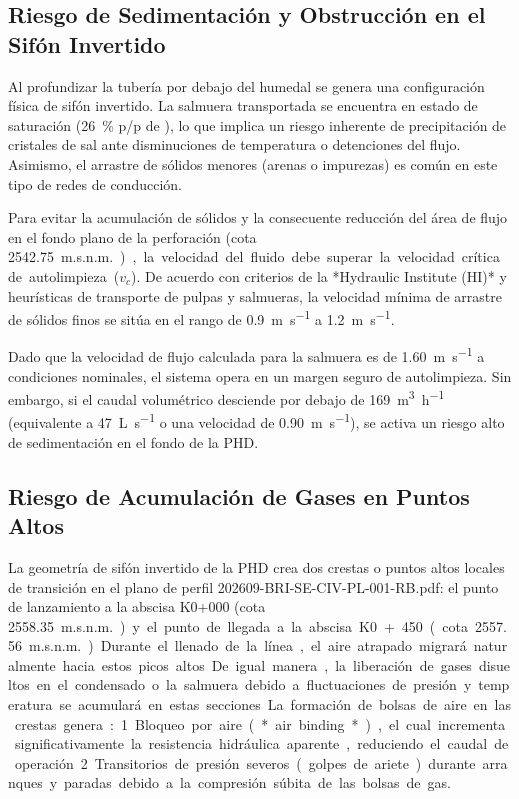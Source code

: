 \subsection{Riesgo de Sedimentación y Obstrucción en el Sifón Invertido}
\label{ssec:analisis_sedimentacion}

Al profundizar la tubería por debajo del humedal se genera una configuración física de sifón invertido. La salmuera transportada se encuentra en estado de saturación (\SI{26}{\percent} p/p de ), lo que implica un riesgo inherente de precipitación de cristales de sal ante disminuciones de temperatura o detenciones del flujo. Asimismo, el arrastre de sólidos menores (arenas o impurezas) es común en este tipo de redes de conducción.

Para evitar la acumulación de sólidos y la consecuente reducción del área de flujo en el fondo plano de la perforación (cota \SI{2542.75}{m.s.n.m.}), la velocidad del fluido debe superar la velocidad crítica de autolimpieza ($v_c$). De acuerdo con criterios de la *Hydraulic Institute (HI)* y heurísticas de transporte de pulpas y salmueras, la velocidad mínima de arrastre de sólidos finos se sitúa en el rango de \SI{0.9}{\meter\per\second} a \SI{1.2}{\meter\per\second}.

Dado que la velocidad de flujo calculada para la salmuera es de \SI{1.60}{\meter\per\second} a condiciones nominales, el sistema opera en un margen seguro de autolimpieza. Sin embargo, si el caudal volumétrico desciende por debajo de \SI{169}{\cubic\meter\per\hour} (equivalente a \SI{47}{\liter\per\second} o una velocidad de \SI{0.90}{\meter\per\second}), se activa un riesgo alto de sedimentación en el fondo de la PHD.

\subsection{Riesgo de Acumulación de Gases en Puntos Altos}
\label{ssec:analisis_gases}

La geometría de sifón invertido de la PHD crea dos crestas o puntos altos locales de transición en el plano de perfil 202609-BRI-SE-CIV-PL-001-RB.pdf: el punto de lanzamiento a la abscisa K0+000 (cota \SI{2558.35}{m.s.n.m.}) y el punto de llegada a la abscisa K0+450 (cota \SI{2557.56}{m.s.n.m.}). 

Durante el llenado de la línea, el aire atrapado migrará naturalmente hacia estos picos altos. De igual manera, la liberación de gases disueltos en el condensado o la salmuera debido a fluctuaciones de presión y temperatura se acumulará en estas secciones. La formación de bolsas de aire en las crestas genera:
1. Bloqueo por aire (*air binding*), el cual incrementa significativamente la resistencia hidráulica aparente, reduciendo el caudal de operación.
2. Transitorios de presión severos (golpes de ariete) durante arranques y paradas debido a la compresión súbita de las bolsas de gas.


